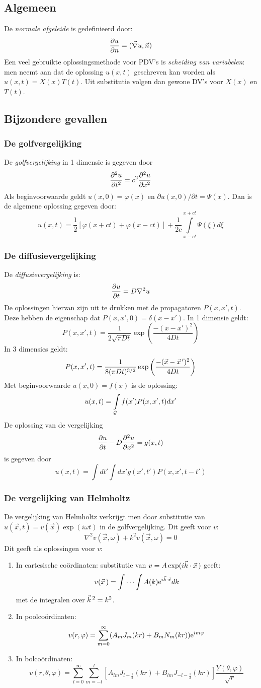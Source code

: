 \subsection{Algemeen}
De {\it normale afgeleide} is gedefinieerd door:
\[
\frac{\partial u}{\partial n}=(\vec{\nabla}u,\vec{n})
\]
Een veel gebruikte oplossingsmethode voor PDV's is {\it scheiding van
variabelen}: men neemt aan dat de oplossing $u(x,t)$ geschreven kan worden
als $u(x,t)=X(x)T(t)$. Uit substitutie volgen dan gewone DV's voor $X(x)$ en
$T(t)$.

\subsection{Bijzondere gevallen}
\subsubsection{De golfvergelijking}
De {\it golfvergelijking} in 1 dimensie is gegeven door
\[
\frac{\partial^2 u}{\partial t^2}=c^2\frac{\partial^2 u}{\partial x^2}
\]
Als beginvoorwaarde geldt $u(x,0)=\varphi(x)$ en
$\partial u(x,0)/\partial t=\Psi(x)$. Dan is de algemene oplossing gegeven
door:
\[
u(x,t)=\frac{1}{2}\left[\varphi(x+ct)+\varphi(x-ct)\right]+\frac{1}{2c}
\int\limits_{x-ct}^{x+ct}\Psi(\xi)d\xi
\]

\subsubsection{De diffusievergelijking}
De {\it diffusievergelijking} is:
\[
\frac{\partial u}{\partial t}=D\nabla^2u
\]
De oplossingen hiervan zijn uit te drukken met de propagatoren $P(x,x',t)$.
Deze hebben de eigenschap dat $P(x,x',0)=\delta(x-x')$. In 1 dimensie geldt:
\[
P(x,x',t)=\frac{1}{2\sqrt{\pi Dt}}\exp\left(\frac{-(x-x')^2}{4Dt}\right)
\]
In 3 dimensies geldt:
\[
P(x,x',t)=\frac{1}{8(\pi Dt)^{3/2}}\exp\left(\frac{-(\vec{x}-\vec{x}\,')^2}{4Dt}\right)
\]
Met beginvoorwaarde $u(x,0)=f(x)$ is de oplossing:
\[
u(x,t)=\int\limits_{\cal G}f(x')P(x,x',t)dx'
\]
De oplossing van de vergelijking
\[
\frac{\partial u}{\partial t}-D\frac{\partial^2 u}{\partial x^2}=g(x,t)
\]
is gegeven door
\[
u(x,t)=\int dt' \int dx'g(x',t')P(x,x',t-t')
\]

\subsubsection{De vergelijking van Helmholtz}
De vergelijking van Helmholtz verkrijgt men door substitutie van
$u(\vec{x},t)=v(\vec{x})\exp(i\omega t)$ in de golfvergelijking. Dit geeft
voor $v$:
\[
\nabla^2v(\vec{x},\omega)+k^2v(\vec{x},\omega)=0
\]
Dit geeft als oplossingen voor $v$:
\begin{enumerate}
\item In cartesische co\"ordinaten: substitutie van
$v=A\exp(i\vec{k}\cdot\vec{x}\,)$ geeft:
\[
v(\vec{x}\,)=\int\cdots\int A(k){\rm e}^{i\vec{k}\cdot\vec{x}}dk
\]
met de integralen over $\vec{k}\,^2=k^2$.
\item In poolco\"ordinaten:
\[
v(r,\varphi)=\sum_{m=0}^\infty(A_mJ_m(kr)+B_mN_m(kr)){\rm e}^{im\varphi}
\]
\item In bolco\"ordinaten:
\[
v(r,\theta,\varphi)=\sum_{l=0}^\infty\sum_{m=-l}^l[A_{lm}J_{l+\frac{1}{2}}(kr)+B_{lm}J_{-l-\frac{1}{2}}(kr)]\frac{Y(\theta,\varphi)}{\sqrt{r}}
\]
\end{enumerate}

